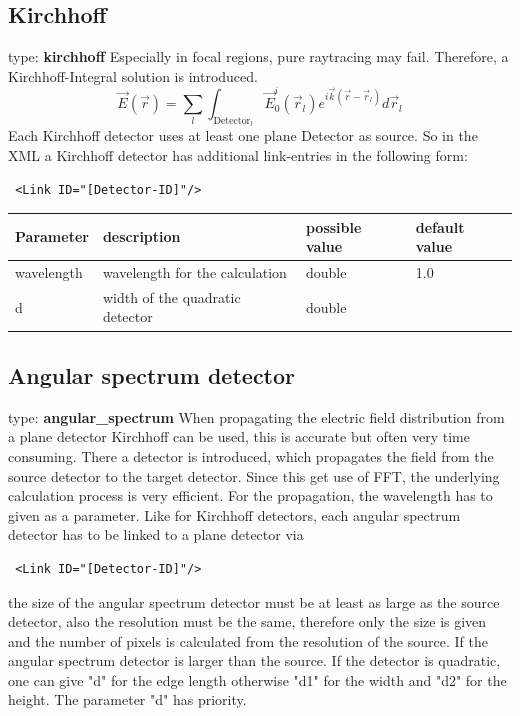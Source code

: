 \documentclass[a4paper,html,11pt,openany]{book}
\begin{document}
 \subsection{Kirchhoff}
 type: \textbf{kirchhoff} \newline
 Especially in focal regions, pure raytracing may fail. Therefore, a Kirchhoff-Integral solution is introduced. 
 \begin{equation}
  \vec{E}(\vec{r})=\sum_l \int_{\text{Detector}_l} \vec{E}^i_0(\vec{r}_l) e^{i\vec{k}(\vec{r}-\vec{r}_l)} d\vec{r}_l 
 \end{equation}
 Each Kirchhoff detector uses at least one plane Detector as source. So in the XML a Kirchhoff detector has additional link-entries in the following form:
   \lstset{language=XML}
 \begin{lstlisting}
 <Link ID="[Detector-ID]"/>
   \end{lstlisting}
\begin{tabular}{p{2cm}|m{3.5cm}|m{3.0cm}|p{1.7cm}}
 Parameter  & description  & possible value & default value\\
 \hline 
 wavelength & wavelength for the calculation & double & 1.0 \\
 \hline
 d & width of the quadratic detector & double & \\
 \hline  
 \end{tabular}
 \subsection{Angular spectrum detector}
 type: \textbf{angular\_spectrum} \newline
 When propagating the electric field distribution from a plane detector Kirchhoff can be used, this is accurate but often very time consuming. There a detector is introduced, which propagates the field from the source detector to the target detector. Since this get use of FFT, the underlying calculation process is very efficient. For the propagation, the wavelength has to given as a parameter.
Like for Kirchhoff detectors, each angular spectrum detector has to be linked to a plane detector via 
 \begin{lstlisting}
 <Link ID="[Detector-ID]"/>
   \end{lstlisting}
  the size of the angular spectrum detector must be at least as large as the source detector, also the resolution must be the same, therefore only the size is given and the number of pixels is calculated from the resolution of the source. If the angular spectrum detector is larger than the source. If the detector is quadratic, one can give "d" for the edge length otherwise "d1" for the width and "d2" for the height. The parameter "d" has priority. 
    
\end{document}
